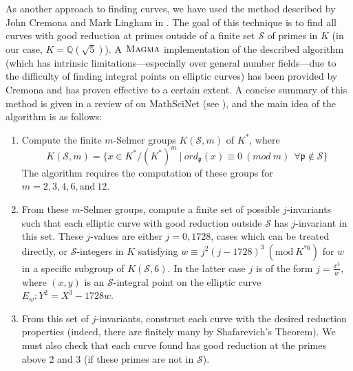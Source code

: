 As another approach to finding curves, we have used the method described by John Cremona and Mark Lingham in \cite{Cre-Lin}. The goal of this technique is to find all curves with good reduction at primes outside of a finite set $\mathcal{S}$ of primes in $K$ (in our case, $K = \mathbb{Q}(\sqrt{5})$). A $\textsc{Magma}$ implementation of the described algorithm (which has intrinsic limitations---especially over general number fields---due to the difficulty of finding integral points on elliptic curves) has been provided by Cremona and has proven effective to a certain extent. A concise summary of this method is given in a review of \cite{Cre-Lin} on MathSciNet (see \cite{msn-review}), and the main idea of the algorithm is as follows:

\begin{enumerate}

\item Compute the finite $m$-Selmer groups $K(\mathcal{S},m)$ of $K^*$, where
\begin{equation}
    K(\mathcal{S},m) = \{x\in K^*/(K^*)^m \ | \ ord_\mathfrak{p}(x) \equiv 0 \ (mod \ m) \ \ \forall \mathfrak{p}\notin \mathcal{S}\} \nonumber
\end{equation}
The algorithm requires the computation of these groups for $m = 2,3,4,6,\text{and}\ 12$.

\item From these $m$-Selmer groups, compute a finite set of possible $j$-invariants such that each elliptic curve with good reduction outside $\mathcal{S}$ has $j$-invariant in this set. These $j$-values are either $j=0,1728$, cases which can be treated directly, or $\mathcal{S}$-integers in $K$ satisfying $w \equiv j^2(j-1728)^3 \ (\text{mod} \ K^{*6})$ for $w$ in a specific subgroup of $K(\mathcal{S},6)$. In the latter case $j$ is of the form $j = \frac{x^3}{w}$, where $(x,y)$ is an $\mathcal{S}$-integral point on the elliptic curve $E_w: Y^2 = X^3 - 1728w$.

\item From this set of $j$-invariants, construct each curve with the desired reduction properties (indeed, there are finitely many by Shafarevich's Theorem). We must also check that each curve found has good reduction at the primes above 2 and 3 (if these primes are not in $\mathcal{S}$).

\end{enumerate}


